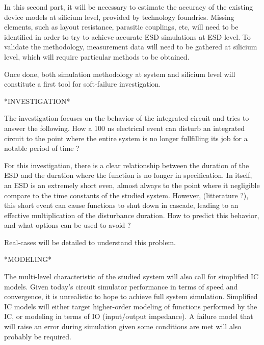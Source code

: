 In this second part, it will be necessary to estimate the accuracy of the existing device models at silicium level, provided by technology foundries.
Missing elements, such as layout resistance, parasitic couplings, etc, will need to be identified in order to try to achieve accurate ESD simulations at ESD level.
To validate the methodology, measurement data will need to be gathered at silicium level, which will require particular methods to be obtained.

Once done, both simulation methodology at system and silicium level will constitute a first tool for soft-failure investigation.

*INVESTIGATION*

The investigation focuses on the behavior of the integrated circuit and tries to answer the following.
How a 100 ns electrical event can disturb an integrated circuit to the point where the entire system is no longer fullfilling its job for a notable period of time ?

For this investigation, there is a clear relationship between the duration of the ESD and the duration where the function is no longer in specification.
In itself, an ESD is an extremely short even, almost always to the point where it negligible compare to the time constants of the studied system.
However, (litterature ?), this short event can cause functions to shut down in cascade, leading to an effective multiplication of the disturbance duration.
How to predict this behavior, and what options can be used to avoid ?

Real-cases will be detailed to understand this problem.

*MODELING*

The multi-level characteristic of the studied system will also call for simplified IC models.
Given today's circuit simulator performance in terms of speed and convergence, it is unrealistic to hope to achieve full system simulation.
Simplified IC models will either target higher-order modeling of functions performed by the IC, or modeling in terms of IO (input/output impedance).
A failure model that will raise an error during simulation given some conditions are met will also probably be required.
